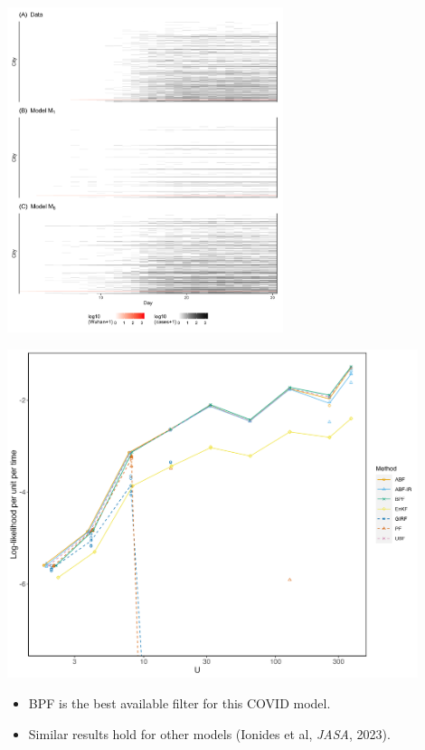 \documentclass{beamer}
\begin{document}
\begin{frame}
  \begin{center}
    \includegraphics[height=9.5cm]{covid/panel_plot-1.png}
    \end{center}
\end{frame}


\begin{frame}
 \includegraphics[width=12cm]{covid/filter_tests10.png}

  \begin{itemize}
\item BPF is the best available filter for this COVID model.
\item Similar results hold for other models (Ionides et al, {\it JASA}, 2023).
  \end{itemize}
  
\end{frame}
\end{document}
